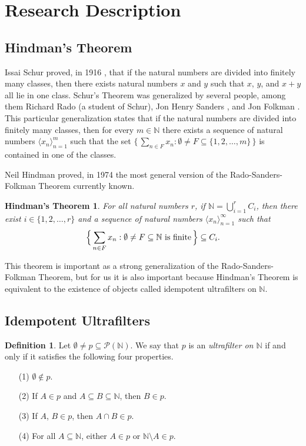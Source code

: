 \documentclass[12pt]{article}
\theoremstyle{plain}
\newtheorem{fst}[thm]{Hindman's Theorem}
\theoremstyle{definition}
\newtheorem{defn}[thm]{Definition}
\newcommand{\bbN}{\mathbb{N}}
\newcommand{\la}{\langle}
\newcommand{\ra}{\rangle}
\begin{document}
\section{Research Description}
\subsection{Hindman's Theorem}
Issai Schur proved, in 1916 \cite{Schur:1916fk}, that if the natural
numbers are divided into finitely many classes, then there exists natural
numbers $x$ and $y$ such that $x$, $y$, and $x+y$ all lie in one
class.
Schur's Theorem was generalized by several people, among them Richard
Rado \cite{Rado:1933kx} (a student of Schur), Jon Henry Sanders
\cite{Sanders:1968uq}, and Jon Folkman \cite{Graham:1971vn}.
This particular generalization states that if the natural numbers are
divided into finitely many classes, then for every $m \in \bbN$ there
exists a
sequence of natural numbers $\la x_n \ra_{n=1}^m$ such that the set
$\bigl\{\, \sum_{n \in F} x_n : \emptyset \ne F \subseteq \{1, 2, \ldots,
m\} \,\bigr\}$ is contained in one of the classes.

Neil Hindman proved, in 1974 \cite{Hindman:1974ys} the most general
version of the Rado-Sanders-Folkman Theorem currently known.
  \begin{fst}
    For all natural numbers $r$, if $\bbN = \bigcup_{i=1}^r C_i$, then
    there exist $i \in \{1, 2, \ldots, r\}$ and a sequence of natural
    numbers $\la x_n \ra_{n=1}^\infty$ such that
      \[
        \Bigl\{\,\sum_{n \in F} x_n : \emptyset \ne F \subseteq \bbN \hbox{
          is finite} \,\Bigr\} \subseteq C_i.
      \]
  \end{fst}
This theorem is important as a strong generalization of
the Rado-Sanders-Folkman Theorem, but for us it is also important because
Hindman's Theorem is equivalent to the existence of objects called
idempotent ultrafilters on $\bbN$.

\subsection{Idempotent Ultrafilters}
  \begin{defn}
    Let $\emptyset \ne p \subseteq \mathcal{P}(\bbN)$.
    We say that $p$ is an \textsl{ultrafilter on $\bbN$} if and only
    if it satisfies the following four properties.
      \begin{itemize}
        \item[(1)] $\emptyset \not\in p$.
        \item[(2)] If $A \in p$ and $A \subseteq B \subseteq \bbN$,
          then $B \in p$.
        \item[(3)] If $A$, $B \in p$, then $A \cap B \in p$.
        \item[(4)] For all $A \subseteq \bbN$, either $A \in p$ or
          $\bbN \setminus A \in p$.
      \end{itemize}
  \end{defn}
\end{document}
